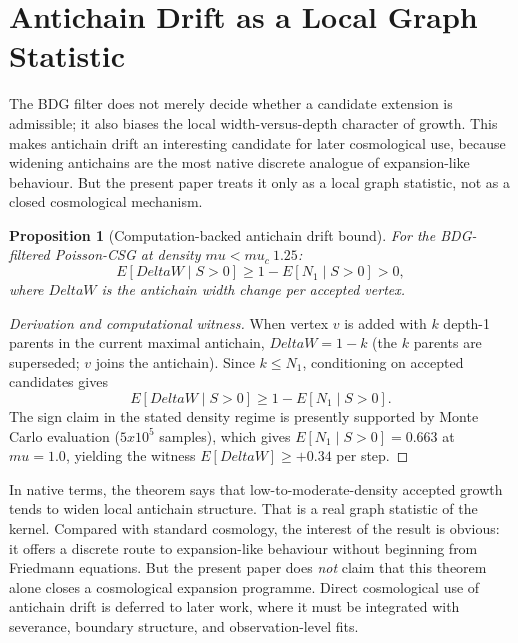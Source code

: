 \documentclass[11pt]{article}
\def\Delta{Delta}%
\def\mu{mu}%
\def\mathbb#1{#1}%
\def\times{x}%
\def\approx{~}%
\newtheorem{proposition}{Proposition}
\begin{document}
\section{Antichain Drift as a Local Graph Statistic}
\label{sec:drift}

The BDG filter does not merely decide whether a candidate extension is admissible; it also biases the local width-versus-depth character of growth. This makes antichain drift an interesting candidate for later cosmological use, because widening antichains are the most native discrete analogue of expansion-like behaviour. But the present paper treats it only as a local graph statistic, not as a closed cosmological mechanism.

\begin{proposition}[Computation-backed antichain drift bound]
\label{thm:drift}
For the BDG-filtered Poisson-CSG at density $\mu<\mu_c\approx 1.25$:
\begin{equation}
\mathbb{E}[\Delta W\mid S>0] \ge 1-\mathbb{E}[N_1\mid S>0] > 0,
\end{equation}
where $\Delta W$ is the antichain width change per accepted vertex.
\end{proposition}
\begin{proof}[Derivation and computational witness]
When vertex $v$ is added with $k$ depth-1 parents in the current maximal antichain, $\Delta W=1-k$ (the $k$ parents are superseded; $v$ joins the antichain). Since $k\le N_1$, conditioning on accepted candidates gives
\[
\mathbb{E}[\Delta W\mid S>0]\ge 1-\mathbb{E}[N_1\mid S>0].
\]
The sign claim in the stated density regime is presently supported by Monte Carlo evaluation ($5\times 10^5$ samples), which gives $\mathbb{E}[N_1\mid S>0]=0.663$ at $\mu=1.0$, yielding the witness $\mathbb{E}[\Delta W]\ge +0.34$ per step.
\end{proof}

In native terms, the theorem says that low-to-moderate-density accepted growth tends to widen local antichain structure. That is a real graph statistic of the kernel. Compared with standard cosmology, the interest of the result is obvious: it offers a discrete route to expansion-like behaviour without beginning from Friedmann equations. But the present paper does \emph{not} claim that this theorem alone closes a cosmological expansion programme. Direct cosmological use of antichain drift is deferred to later work, where it must be integrated with severance, boundary structure, and observation-level fits.
\end{document}
